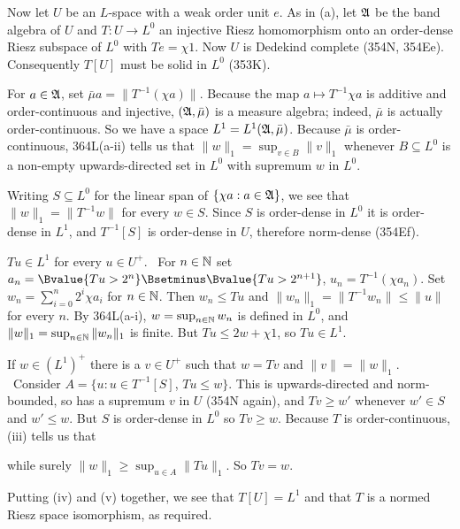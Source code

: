 {\medskip

 Now let $U$ be an $L$-space with a weak order unit $e$.
As in (a), let $\frak A$ be the band algebra of $U$ and $T:U\to L^0$ an
injective Riesz homomorphism onto an order-dense Riesz subspace of $L^0$
with $Te=\chi 1$.   Now $U$ is Dedekind complete (354N, 354Ee).
Consequently $T[U]$ must be solid in $L^0$ (353K).

\medskip

 For $a\in\frak A$, set $\bar\mu a=\|T^{-1}(\chi a)\|$.
Because the map $a\mapsto T^{-1}\chi a$ is additive and order-continuous
and injective, $(\frak A,\bar\mu)$ is a measure algebra;  indeed,
$\bar\mu$ is actually order-continuous.   So we have a space
$L^1=L^1(\frak A,\bar\mu)$.   Because $\bar\mu$ is order-continuous,
364L(a-ii) tells us that $\|w\|_1=\sup_{v\in B}\|v\|_1$ whenever
$B\subseteq L^0$ is a non-empty upwards-directed set in $L^0$
with supremum $w$ in $L^0$.

Writing $S\subseteq L^0$ for
the linear span of $\{\chi a:a\in\frak A\}$, we see that
$\|w\|_1=\|T^{-1}w\|$ for every $w\in S$.   Since $S$ is order-dense in
$L^0$ it is order-dense in $L^1$, and $T^{-1}[S]$ is order-dense in $U$,
therefore norm-dense (354Ef).

\medskip

$Tu\in L^1$ for every $u\in U^+$.   \Prf\ For $n\in\Bbb N$ set
$a_n=\Bvalue{Tu>2^n}\Bsetminus\Bvalue{Tu>2^{n+1}}$, $u_n=T^{-1}(\chi a_n)$.
Set $w_n=\sum_{i=0}^n2^i\chi a_i$ for $n\in\Bbb N$.   Then $w_n\le Tu$
and $\|w_n\|_1=\|T^{-1}w_n\|\le\|u\|$ for every $n$.   By 364L(a-i),
$w=\sup_{n\in\Bbb N}w_n$ is defined in $L^0$, and
$\|w\|_1=\sup_{n\in\Bbb N}\|w_n\|_1$ is finite.   But $Tu\le 2w+\chi 1$, so
$Tu\in L^1$.\ \QeD\

\medskip

 If $w\in(L^1)^+$ there is a $v\in U^+$ such that $w=Tv$ and
$\|v\|=\|w\|_1$.   \Prf\ Consider
$A=\{u:u\in T^{-1}[S]$, $Tu\le w\}$.   This is upwards-directed and
norm-bounded, so has a supremum $v$ in $U$ (354N again), and
$Tv\ge w'$ whenever $w'\in S$ and $w'\le w$.   But $S$ is order-dense in
$L^0$ so $Tv\ge w$.   Because $T$ is order-continuous, (iii) tells us that


\noindent while surely $\|w\|_1\ge\sup_{u\in A}\|Tu\|_1$.   So $Tv=w$.\
\Qed

\medskip

 Putting (iv) and (v) together, we see that $T[U]=L^1$ and
that $T$ is a normed Riesz space isomorphism, as required.
}%

